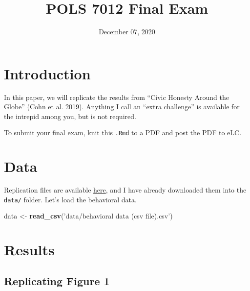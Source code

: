 \documentclass[12pt,halfline,a4paper,]{ouparticle}
\newenvironment{Shaded}{\begin{snugshade}}{\end{snugshade}}
\newcommand{\KeywordTok}[1]{\textcolor[rgb]{0.13,0.29,0.53}{\textbf{#1}}}
\newcommand{\NormalTok}[1]{#1}
\newcommand{\StringTok}[1]{\textcolor[rgb]{0.31,0.60,0.02}{#1}}
\begin{document}
\title{POLS 7012 Final Exam}

\author{%
\address{University of Georgia}
\and
{}\address{University of Georgia}
}

\abstract{}

\date{December 07, 2020}

\keywords{}

\maketitle



\hypertarget{introduction}{%
\section{Introduction}\label{introduction}}

In this paper, we will replicate the results from ``Civic Honesty Around
the Globe'' (Cohn et al. 2019). Anything I call an ``extra challenge''
is available for the intrepid among you, but is not required.

To submit your final exam, knit this \texttt{.Rmd} to a PDF and post the
PDF to eLC.

\hypertarget{data}{%
\section{Data}\label{data}}

Replication files are available
\href{https://dataverse.harvard.edu/dataverse/honesty}{here}, and I have
already downloaded them into the \texttt{data/} folder. Let's load the
behavioral data.

\begin{Shaded}
\begin{Highlighting}[]
\NormalTok{data <-}\StringTok{ }\KeywordTok{read_csv}\NormalTok{(}\StringTok{'data/behavioral data (csv file).csv'}\NormalTok{)}
\end{Highlighting}
\end{Shaded}

\hypertarget{results}{%
\section{Results}\label{results}}

\hypertarget{replicating-figure-1}{%
\subsection{Replicating Figure 1}\label{replicating-figure-1}}
\end{document}
